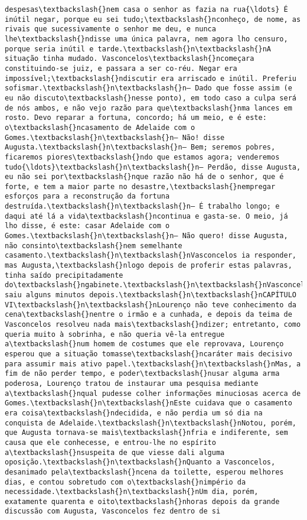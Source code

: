 \documentclass[11pt]{article}
\begin{document}
\begin{Verbatim}[commandchars=\\\{\}]
despesas\textbackslash{}nem casa o senhor as fazia na rua{\ldots} É inútil negar, porque eu sei tudo;\textbackslash{}nconheço, de nome, as rivais que sucessivamente o senhor me deu, e nunca lhe\textbackslash{}ndisse uma única palavra, nem agora lho censuro, porque seria inútil e tarde.\textbackslash{}n\textbackslash{}nA situação tinha mudado. Vasconcelos\textbackslash{}ncomeçara constituindo-se juiz, e passara a ser co-réu. Negar era impossível;\textbackslash{}ndiscutir era arriscado e inútil. Preferiu sofismar.\textbackslash{}n\textbackslash{}n— Dado que fosse assim (e eu não discuto\textbackslash{}nesse ponto), em todo caso a culpa será de nós ambos, e não vejo razão para que\textbackslash{}nma lances em rosto. Devo reparar a fortuna, concordo; há um meio, e é este: o\textbackslash{}ncasamento de Adelaide com o Gomes.\textbackslash{}n\textbackslash{}n— Não! disse Augusta.\textbackslash{}n\textbackslash{}n— Bem; seremos pobres, ficaremos piores\textbackslash{}ndo que estamos agora; venderemos tudo{\ldots}\textbackslash{}n\textbackslash{}n— Perdão, disse Augusta, eu não sei por\textbackslash{}nque razão não há de o senhor, que é forte, e tem a maior parte no desastre,\textbackslash{}nempregar esforços para a reconstrução da fortuna destruída.\textbackslash{}n\textbackslash{}n— É trabalho longo; e daqui até lá a vida\textbackslash{}ncontinua e gasta-se. O meio, já lho disse, é este: casar Adelaide com o Gomes.\textbackslash{}n\textbackslash{}n— Não quero! disse Augusta, não consinto\textbackslash{}nem semelhante casamento.\textbackslash{}n\textbackslash{}nVasconcelos ia responder, mas Augusta,\textbackslash{}nlogo depois de proferir estas palavras, tinha saído precipitadamente do\textbackslash{}ngabinete.\textbackslash{}n\textbackslash{}nVasconcelos saiu alguns minutos depois.\textbackslash{}n\textbackslash{}nCAPÍTULO VI\textbackslash{}n\textbackslash{}nLourenço não teve conhecimento da cena\textbackslash{}nentre o irmão e a cunhada, e depois da teima de Vasconcelos resolveu nada mais\textbackslash{}ndizer; entretanto, como queria muito à sobrinha, e não queria vê-la entregue a\textbackslash{}num homem de costumes que ele reprovava, Lourenço esperou que a situação tomasse\textbackslash{}ncaráter mais decisivo para assumir mais ativo papel.\textbackslash{}n\textbackslash{}nMas, a fim de não perder tempo, e poder\textbackslash{}nusar alguma arma poderosa, Lourenço tratou de instaurar uma pesquisa mediante a\textbackslash{}nqual pudesse colher informações minuciosas acerca de Gomes.\textbackslash{}n\textbackslash{}nEste cuidava que o casamento era coisa\textbackslash{}ndecidida, e não perdia um só dia na conquista de Adelaide.\textbackslash{}n\textbackslash{}nNotou, porém, que Augusta tornava-se mais\textbackslash{}nfria e indiferente, sem causa que ele conhecesse, e entrou-lhe no espírito a\textbackslash{}nsuspeita de que viesse dali alguma oposição.\textbackslash{}n\textbackslash{}nQuanto a Vasconcelos, desanimado pela\textbackslash{}ncena da toilette, esperou melhores dias, e contou sobretudo com o\textbackslash{}nimpério da necessidade.\textbackslash{}n\textbackslash{}nUm dia, porém, exatamente quarenta e oito\textbackslash{}nhoras depois da grande discussão com Augusta, Vasconcelos fez dentro de si 
\end{Verbatim}
\end{document}
